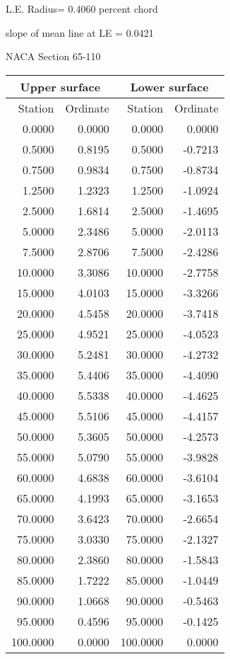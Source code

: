 \documentclass[11pt]{book}
\begin{document}
L.E. Radius=  0.4060 percent chord


 slope of mean line at LE =  0.0421
 \newpage
  \label{s65-110}
 \begin{Large}
 NACA Section 65-110
 \end{Large}
  
 \vspace{8mm}
 \begin{tabular}{|r|r|r|r|} \hline 
 \multicolumn{2}{|c|}{Upper surface} & \multicolumn{2}{|c|}{Lower surface} \\
 \hline
 Station & Ordinate & Station & Ordinate \\
 \hline
0.0000 & 0.0000 & 0.0000 & 0.0000 \\
0.5000 & 0.8195 & 0.5000 & -0.7213 \\
0.7500 & 0.9834 & 0.7500 & -0.8734 \\
1.2500 & 1.2323 & 1.2500 & -1.0924 \\
2.5000 & 1.6814 & 2.5000 & -1.4695 \\
5.0000 & 2.3486 & 5.0000 & -2.0113 \\
7.5000 & 2.8706 & 7.5000 & -2.4286 \\
10.0000 & 3.3086 & 10.0000 & -2.7758 \\
15.0000 & 4.0103 & 15.0000 & -3.3266 \\
20.0000 & 4.5458 & 20.0000 & -3.7418 \\
25.0000 & 4.9521 & 25.0000 & -4.0523 \\
30.0000 & 5.2481 & 30.0000 & -4.2732 \\
35.0000 & 5.4406 & 35.0000 & -4.4090 \\
40.0000 & 5.5338 & 40.0000 & -4.4625 \\
45.0000 & 5.5106 & 45.0000 & -4.4157 \\
50.0000 & 5.3605 & 50.0000 & -4.2573 \\
55.0000 & 5.0790 & 55.0000 & -3.9828 \\
60.0000 & 4.6838 & 60.0000 & -3.6104 \\
65.0000 & 4.1993 & 65.0000 & -3.1653 \\
70.0000 & 3.6423 & 70.0000 & -2.6654 \\
75.0000 & 3.0330 & 75.0000 & -2.1327 \\
80.0000 & 2.3860 & 80.0000 & -1.5843 \\
85.0000 & 1.7222 & 85.0000 & -1.0449 \\
90.0000 & 1.0668 & 90.0000 & -0.5463 \\
95.0000 & 0.4596 & 95.0000 & -0.1425 \\
100.0000 & 0.0000 & 100.0000 & 0.0000 \\
 \hline 
 \end{tabular}
\end{document}
